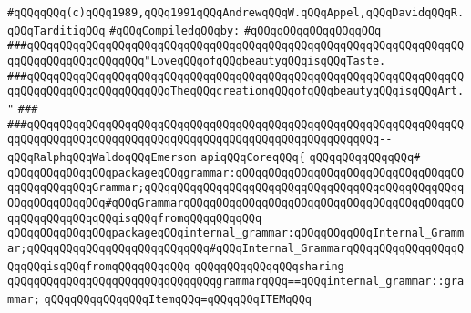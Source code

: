 \label{src/app/yacc/src/core.api}
\verb|#qQQqqQQq(c)qQQq1989,qQQq1991qQQqAndrewqQQqW.qQQqAppel,qQQqDavidqQQqR.qQQqTarditiqQQq|\newline
\newline
\verb|#qQQqCompiledqQQqby:|\newline
\verb|#qQQqqQQqqQQqqQQqqQQq|\newline
\newline
\newline
\newline
\verb|###qQQqqQQqqQQqqQQqqQQqqQQqqQQqqQQqqQQqqQQqqQQqqQQqqQQqqQQqqQQqqQQqqQQqqQQqqQQqqQQqqQQqqQQq"LoveqQQqofqQQqbeautyqQQqisqQQqTaste.|\newline
\verb|###qQQqqQQqqQQqqQQqqQQqqQQqqQQqqQQqqQQqqQQqqQQqqQQqqQQqqQQqqQQqqQQqqQQqqQQqqQQqqQQqqQQqqQQqqQQqTheqQQqcreationqQQqofqQQqbeautyqQQqisqQQqArt."|\newline
\verb|###|\newline
\verb|###qQQqqQQqqQQqqQQqqQQqqQQqqQQqqQQqqQQqqQQqqQQqqQQqqQQqqQQqqQQqqQQqqQQqqQQqqQQqqQQqqQQqqQQqqQQqqQQqqQQqqQQqqQQqqQQqqQQqqQQqqQQq--qQQqRalphqQQqWaldoqQQqEmerson|\newline
\newline
\newline
\newline
\verb|apiqQQqCoreqQQq{|\newline
\verb|qQQqqQQqqQQqqQQq#|\newline
\verb|qQQqqQQqqQQqqQQqpackageqQQqgrammar:qQQqqQQqqQQqqQQqqQQqqQQqqQQqqQQqqQQqqQQqqQQqqQQqGrammar;qQQqqQQqqQQqqQQqqQQqqQQqqQQqqQQqqQQqqQQqqQQqqQQqqQQqqQQqqQQqqQQq#qQQqGrammarqQQqqQQqqQQqqQQqqQQqqQQqqQQqqQQqqQQqqQQqqQQqqQQqqQQqqQQqqQQqisqQQqfromqQQqqQQqqQQq|\newline
\verb|qQQqqQQqqQQqqQQqpackageqQQqinternal_grammar:qQQqqQQqqQQqInternal_Grammar;qQQqqQQqqQQqqQQqqQQqqQQqqQQq#qQQqInternal_GrammarqQQqqQQqqQQqqQQqqQQqqQQqisqQQqfromqQQqqQQqqQQq|\newline
\verb|qQQqqQQqqQQqqQQqsharing|\newline
\verb|qQQqqQQqqQQqqQQqqQQqqQQqqQQqqQQqgrammarqQQq==qQQqinternal_grammar::grammar;|\newline
\newline
\verb|qQQqqQQqqQQqqQQqItemqQQq=qQQqqQQqITEMqQQq|\newline

